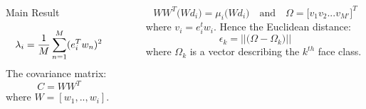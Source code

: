 \documentclass[final]{beamer}
\newlength{\sepwid}
\newlength{\onecolwid}
\newlength{\middlecolwid}
\begin{document}
\begin{frame}[t]
\begin{columns}[t]
\begin{column}{\middlecolwid}
\begin{alertblock}{Main Result}
\end{alertblock}

\vspace{-5mm}

\begin{block}


\begin{equation*}
\lambda_i = {1\over M}\sum_{n=1}^M(e_i^T w_n)^2
\end{equation*}
The covariance matrix:\\
 \begin{equation*}
C=WW^T
\end{equation*}
where $W = [w_1,..,w_i]$.\\

\end{block}
\end{column} %


\begin{column}{\sepwid}\end{column} %

\begin{column}{\onecolwid} %




\begin{block}

\begin{equation*}
WW^T\Big(Wd_i\Big) =\mu_i\Big(Wd_i\Big) \quad
\text{and} \quad \Omega = \Big[v_1v_2...v_{M'}\Big]^T
\end{equation*}
where $v_i=e_i^tw_i$. Hence the Euclidean distance:\\
\begin{equation*}
\epsilon_k = \Big|\Big|\Big(\Omega - \Omega_k\Big)\Big|\Big|
\end{equation*}
where $\Omega_k$ is a vector describing the $k^{th}$ face class.


\end{block}
\end{column}
\end{columns}
\end{frame}
\end{document}
